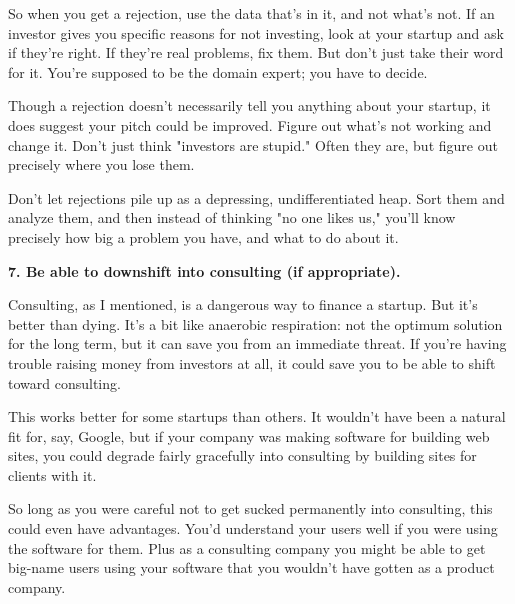 So when you get a
                  rejection, use the data that's in it, and not what's not. If
                  an investor gives you specific reasons for not investing, look
                  at your startup and ask if they're right. If they're real
                  problems, fix them. But don't just take their word for it.
                  You're supposed to be the domain expert; you have to
                  decide.

Though a rejection doesn't necessarily tell
                  you anything about your startup, it does suggest your pitch
                  could be improved. Figure out what's not working and change
                  it. Don't just think "investors are stupid." Often they are,
                  but figure out precisely where you lose them.

Don't
                  let rejections pile up as a depressing, undifferentiated heap.
                  Sort them and analyze them, and then instead of thinking "no
                  one likes us," you'll know precisely how big a problem you
                  have, and what to do about it.


                  \textbf{7. Be able to downshift into consulting (if
                    appropriate).}

Consulting, as I mentioned, is a dangerous way to
                  finance a startup. But it's better than dying. It's a bit like
                  anaerobic respiration: not the optimum solution for the long
                  term, but it can save you from an immediate threat. If you're
                  having trouble raising money from investors at all, it could
                  save you to be able to shift toward consulting.

This
                  works better for some startups than others. It wouldn't have
                  been a natural fit for, say, Google, but if your company was
                  making software for building web sites, you could degrade
                  fairly gracefully into consulting by building sites for
                  clients with it.

So long as you were careful not to
                  get sucked permanently into consulting, this could even have
                  advantages. You'd understand your users well if you were using
                  the software for them. Plus as a consulting company you might
                  be able to get big-name users using your software that you
                  wouldn't have gotten as a product company.

